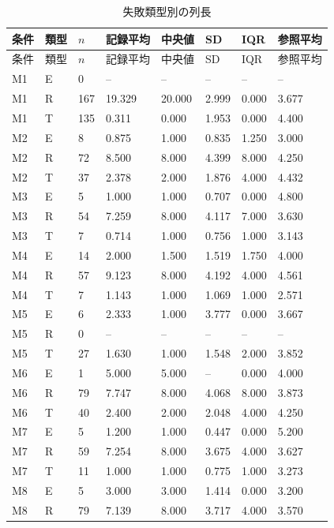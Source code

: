 {\scriptsize\setlength{\tabcolsep}{3pt}
\begin{longtable}{llllllll}
\caption{失敗類型別の列長}\label{tab:failure_lengths}\\
\hline
条件 & 類型 & $n$ & 記録平均 & 中央値 & SD & IQR & 参照平均\\\hline\endfirsthead
条件 & 類型 & $n$ & 記録平均 & 中央値 & SD & IQR & 参照平均\\\hline\endhead
\hline\endfoot
M1 & E & 0 & -- & -- & -- & -- & -- \\
M1 & R & 167 & 19.329 & 20.000 & 2.999 & 0.000 & 3.677 \\
M1 & T & 135 & 0.311 & 0.000 & 1.953 & 0.000 & 4.400 \\
M2 & E & 8 & 0.875 & 1.000 & 0.835 & 1.250 & 3.000 \\
M2 & R & 72 & 8.500 & 8.000 & 4.399 & 8.000 & 4.250 \\
M2 & T & 37 & 2.378 & 2.000 & 1.876 & 4.000 & 4.432 \\
M3 & E & 5 & 1.000 & 1.000 & 0.707 & 0.000 & 4.800 \\
M3 & R & 54 & 7.259 & 8.000 & 4.117 & 7.000 & 3.630 \\
M3 & T & 7 & 0.714 & 1.000 & 0.756 & 1.000 & 3.143 \\
M4 & E & 14 & 2.000 & 1.500 & 1.519 & 1.750 & 4.000 \\
M4 & R & 57 & 9.123 & 8.000 & 4.192 & 4.000 & 4.561 \\
M4 & T & 7 & 1.143 & 1.000 & 1.069 & 1.000 & 2.571 \\
M5 & E & 6 & 2.333 & 1.000 & 3.777 & 0.000 & 3.667 \\
M5 & R & 0 & -- & -- & -- & -- & -- \\
M5 & T & 27 & 1.630 & 1.000 & 1.548 & 2.000 & 3.852 \\
M6 & E & 1 & 5.000 & 5.000 & -- & 0.000 & 4.000 \\
M6 & R & 79 & 7.747 & 8.000 & 4.068 & 8.000 & 3.873 \\
M6 & T & 40 & 2.400 & 2.000 & 2.048 & 4.000 & 4.250 \\
M7 & E & 5 & 1.200 & 1.000 & 0.447 & 0.000 & 5.200 \\
M7 & R & 59 & 7.254 & 8.000 & 3.675 & 4.000 & 3.627 \\
M7 & T & 11 & 1.000 & 1.000 & 0.775 & 1.000 & 3.273 \\
M8 & E & 5 & 3.000 & 3.000 & 1.414 & 0.000 & 3.200 \\
M8 & R & 79 & 7.139 & 8.000 & 3.717 & 4.000 & 3.570 \\

\end{longtable}}
